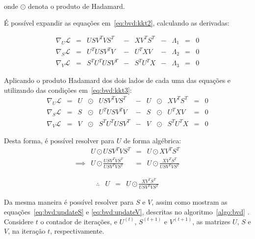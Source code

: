 \documentclass[
    12pt,                %
    oneside,            %
    a4paper,            %
    english,            %
    brazil                %
    ]{abntex2ppgsi}
\begin{document}
onde $\odot$ denota o produto de Hadamard.

É possível expandir as equações em~\ref{eq:bvd:kkt2}, calculando as derivadas:

\[
\begin{array}{lclclclcl}
    \nabla_U \mathcal{L} & = & U S V^{T} V S^{T}     & - & X V^{T} S^{T} & - & \Lambda_1 & = & 0 \\
    \nabla_S \mathcal{L} & = & U^{T} U S V^{T} V     & - & U^{T} X V     & - & \Lambda_2 & = & 0 \\
    \nabla_V \mathcal{L} & = & S^{T} U^{T} U S V^{T} & - & S^{T} U^{T} X & - & \Lambda_3 & = & 0
\end{array}
\]

Aplicando o produto Hadamard dos dois lados de cada uma das equações e utilizando das condições em~\ref{eq:bvd:kkt3}:
\[
\begin{array}{lclclclclcl}
    \nabla_U \mathcal{L} & = & U & \odot & U S V^{T} V S^{T}     & - & U & \odot & X V^{T} S^{T} & = & 0 \\
    \nabla_S \mathcal{L} & = & S & \odot & U^{T} U S V^{T} V     & - & S & \odot & U^{T} X V     & = & 0 \\
    \nabla_V \mathcal{L} & = & V & \odot & S^{T} U^{T} U S V^{T} & - & V & \odot & S^{T} U^{T} X & = & 0
\end{array}
\]

Desta forma, é possível resolver para $U$ de forma algébrica:
\[
\begin{array}{lclclcl}
             & U \odot U S V^{T} V S^{T}                           & = & U \odot X V^{T} S^{T} \\
    \implies & U \odot \frac{U S V^{T} V S^{T}}{U S V^{T} V S^{T}} & = & U \odot \frac{X V^{T} S^{T}}{U S V^{T} V S^{T}}
\end{array}
\]

\[
    \begin{array}{lclcl}
        \therefore & U & = & U \odot \frac{X V^{T} S^{T}}{U S V^{T} V S^{T}}
    \end{array}
\]

Da mesma maneira é possível resolver para $S$ e $V$, assim como mostram as equações~\ref{eq:bvd:updateS} e \ref{eq:bvd:updateV}, descritas no algoritmo~\ref{algo:bvd} \cite{Long2005}.
Considere $t$ o contador de iterações, e $U^{(t)}$, $S^{(t+1)}$ e $V^{(t+1)}$, as matrizes $U$, $S$ e $V$, na iteração $t$, respectivamente.
\end{document}
